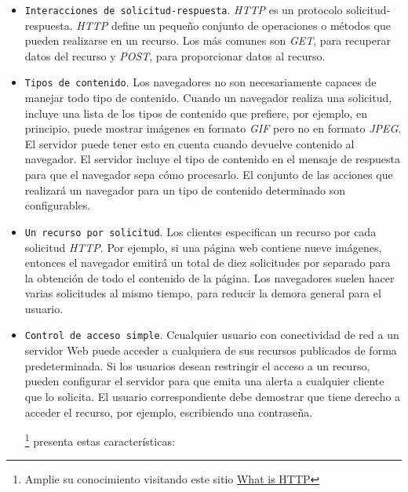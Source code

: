 



	
	\begin{itemize}
		\item \texttt{Interacciones de solicitud-respuesta}.  \textit{HTTP} es un \gls{protocolo solicitud-respuesta}.  \textit{HTTP} define un pequeño conjunto de operaciones o métodos que pueden 	realizarse en un recurso. Los más comunes son \textit{GET}, para recuperar datos del recurso y \textit{POST}, para proporcionar datos al recurso.
		
		\item \texttt{Tipos de contenido}. Los navegadores no son necesariamente capaces de manejar todo tipo de contenido. Cuando un navegador realiza una solicitud, incluye una lista de los tipos de contenido que prefiere, por ejemplo, en principio, puede mostrar imágenes en formato \textit{GIF} 		
		pero no en formato \textit{JPEG}. El servidor puede tener esto en cuenta cuando devuelve contenido al navegador. El servidor incluye el tipo de contenido en el mensaje de respuesta para que el navegador sepa cómo procesarlo. El conjunto de las acciones que realizará un navegador para un tipo de contenido determinado son configurables.
		
		\item 	\texttt{Un recurso por solicitud}. Los clientes especifican un recurso por cada  solicitud \textit{HTTP}. Por ejemplo, si una p\'agina web  contiene nueve imágenes,  entonces el navegador emitirá un total de diez solicitudes por separado para la obtención de todo el contenido de la página. Los navegadores suelen hacer varias solicitudes al mismo tiempo, para reducir la demora general para el usuario.
		
		\item \texttt{Control de acceso simple}.  Ccualquier usuario con conectividad de red a un servidor Web puede acceder a cualquiera de sus recursos publicados de forma predeterminada. Si los usuarios desean restringir el acceso a un recurso,  pueden configurar el servidor para que emita una alerta  a cualquier cliente que lo solicita. El usuario correspondiente debe demostrar que tiene derecho a acceder el recurso, por ejemplo, escribiendo una contraseña.
		
	
	
	
	
	
	 \footnote{Amplie su conocimiento visitando este sitio \href{https://www.w3schools.com/whatis/whatis_http.asp} {What is HTTP}  } presenta estas caracter\'isticas:
	 

\end{itemize}
